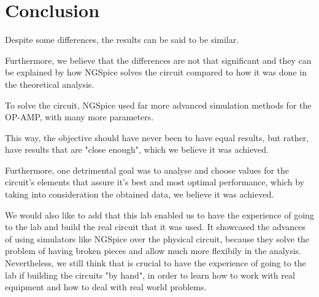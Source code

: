 \section{Conclusion}
\label{sec:conclusion}

\indent

Despite some differences, the results can be said to be similar.

Furthermore, we believe that the differences are not that significant and they can be explained by how NGSpice solves the circuit compared to how it was done in the theoretical analysis.

To solve the circuit, NGSpice used far more advanced simulation methods for the OP-AMP, with many more parameters. 

This way, the objective should have never been to have equal results, but rather, have results that are "close enough", which we believe it was achieved.

Furthermore, one detrimental goal was to analyse and choose values for the circuit's elements that assure it's best and most optimal performance, which by taking into consideration the obtained data, we believe it was achieved.

We would also like to add that this lab enabled us to have the experience of going to the lab and build the real circuit that it was used. It showcased the advances of using simulators like NGSpice over the physical circuit, because they solve the problem of having broken pieces and allow much more flexibily in the analysis. Nevertheless, we still think that is crucial to have the experience of going to the lab if building the circuits "by hand", in order to learn how to work with real equipment and how to deal with real world problems. 

